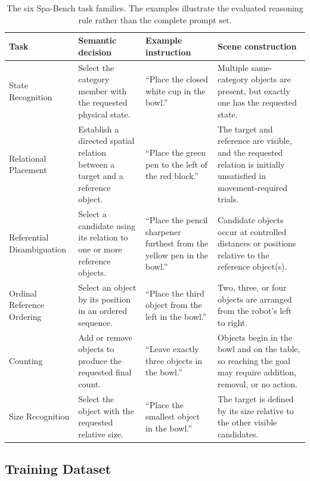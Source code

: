 \documentclass[conference]{IEEEtran}
\begin{document}
\begin{table}[t]
\centering
\small
\setlength{\tabcolsep}{4pt}
\caption{The six Spa-Bench task families. The examples illustrate the evaluated reasoning rule rather than the complete prompt set.}
\label{tab:benchmark_tasks}
\begin{tabular}{p{} p{} p{} p{}}
\toprule
\textbf{Task} & \textbf{Semantic decision} & \textbf{Example instruction} & \textbf{Scene construction} \\
\midrule
State Recognition
& Select the category member with the requested physical state.
& ``Place the closed white cup in the bowl.''
& Multiple same-category objects are present, but exactly one has the requested state. \\

Relational Placement
& Establish a directed spatial relation between a target and a reference object.
& ``Place the green pen to the left of the red block.''
& The target and reference are visible, and the requested relation is initially unsatisfied in movement-required trials. \\

Referential Disambiguation
& Select a candidate using its relation to one or more reference objects.
& ``Place the pencil sharpener furthest from the yellow pen in the bowl.''
& Candidate objects occur at controlled distances or positions relative to the reference object(s). \\

Ordinal Reference Ordering
& Select an object by its position in an ordered sequence.
& ``Place the third object from the left in the bowl.''
& Two, three, or four objects are arranged from the robot's left to right. \\

Counting
& Add or remove objects to produce the requested final count.
& ``Leave exactly three objects in the bowl.''
& Objects begin in the bowl and on the table, so reaching the goal may require addition, removal, or no action. \\

Size Recognition
& Select the object with the requested relative size.
& ``Place the smallest object in the bowl.''
& The target is defined by its size relative to the other visible candidates. \\
\bottomrule
\end{tabular}
\end{table}

\subsection{Training Dataset}
\end{document}
